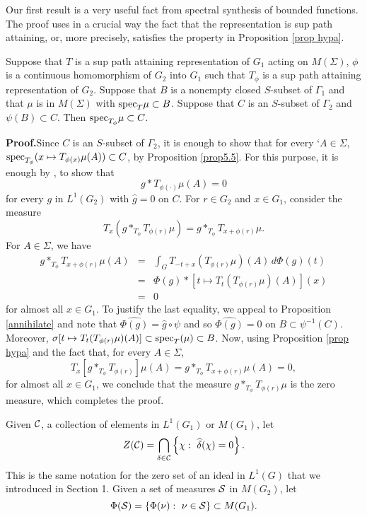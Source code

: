 \documentclass[12pt,leqno]{article}
\def\spec{{\rm spec}}
\begin{document}
Our first result is a very useful fact
from spectral synthesis of bounded functions.
The proof uses in a crucial way the fact that the representation is sup path attaining, or, more precisely, satisfies the property in Proposition \ref{prop hypa}.






\begin{lemma}
Suppose that $T$ is a sup path attaining representation of $G_1$ acting on $M(\Sigma)$, $\phi$ is a continuous homomorphism of $G_2$ into $G_1$ 
such that $T_\phi$ is a sup path 
attaining representation
of $G_2$.  Suppose that $B$ is a nonempty closed $S$-subset of
$\Gamma_1$ and that $\mu$ is in $M(\Sigma)$ with
$\spec_T\mu\subset B$.  Suppose that
$C$ is an $S$-subset of $\Gamma_2$ and
$\psi(B)\subset C$.
Then $\spec_{T_\phi}\mu\subset C$.
\label{lem3.1}
\end{lemma}

{\bf Proof.}\quad Since $C$ is an $S$-subset of $\Gamma_2$, it is enough to show that for every 
`$A\in \Sigma$, $\spec_{T_\phi}(x\mapsto T_{\phi(x)}\mu(A))\subset C$, by 
Proposition \ref{prop5.5}.
For this purpose, it is enough by 
 \cite[Theorem (40.8)]{hr2}, to show that 
$$g*T_{\phi(\cdot)}\mu(A)=0$$
for every $g$ in $L^1(G_2)$ with
$\widehat{g}=0$ on $C$.  
For $r\in G_2$ and $x\in G_1$, consider the measure
$$T_x(g*_{T_\phi}T_{\phi(r)}\mu)=
g*_{T_\phi}T_{x+\phi(r)}\mu.$$
For $A\in \Sigma$, we have
\begin{eqnarray*}
g*_{T_\phi} T_{x+\phi(r)}\mu(A)&=&
\int_GT_{-t+x}(T_{\phi(r)}\mu)(A)\,d\Phi(g)(t)\\
&=&\Phi(g)*[t\mapsto T_t(T_{\phi(r)}\mu)(A)](x)\\
&=&0
\end{eqnarray*}
for almost all $x\in G_1$.  
To justify the last equality,
we appeal to Proposition \ref{annihilate} and
note that
$\widehat{\Phi(g)}=\widehat{g}\circ \psi$ and so $\widehat{\Phi(g)}=0$ on $B\subset \psi^{-1}(C)$.
Moreover, $\sigma[t\mapsto T_t(T_{\phi(r)}\mu)(A)]
\subset \spec_T(\mu)\subset B$.
Now, using Proposition \ref{prop hypa} and the fact that,
for every $A\in \Sigma$,
$$T_x[g*_{T_\phi} 
T_{\phi(r)}]\mu(A) =g*_{T_\phi}T_{x+\phi(r)}\mu(A)=0,$$
for almost all $x\in G_1$, we conclude that the 
measure $g*_{T_\phi} 
T_{\phi(r)}\mu$ is the zero measure, which completes the proof.





Given ${\cal C}$, a collection of elements in
$L^1(G_1)$ or $M(G_1)$, let 
$$Z({\cal C})=\bigcap_{\delta\in {\cal C}}
\left\{
\chi:\ \widehat{\delta}(\chi)=0\right\}.$$
This is the same notation for the zero set of an ideal
in $L^1(G)$ that we introduced in Section 1.  
Given a set of measures ${\cal S}$ in $M(G_2)$,
let 
$$\Phi({\cal S})=\left\{
\Phi(\nu):\ \nu \in {\cal S}\right\}\subset M(G_1).$$ 
\end{document}
